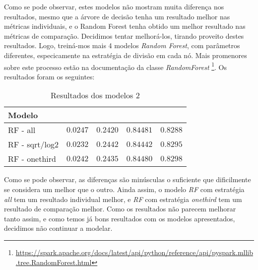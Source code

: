 \documentclass[justified, 11pt]{scrartcl}
\begin{document}
  Como se pode observar, estes modelos não mostram muita diferença nos resultados, mesmo que a árvore de decisão tenha um resultado melhor nas métricas individuais, e o Random Forest tenha obtido um melhor resultado nas métricas de comparação. Decidimos tentar melhorá-los, tirando proveito destes resultados. Logo, treiná-mos mais 4 modelos \textit{Random Forest}, com parâmetros diferentes, especicamente na estratégia de divisão em cada nó. Mais promenores sobre este processo estão na documentação da classe \textit{RandomForest} \footnote{\url{https://spark.apache.org/docs/latest/api/python/reference/api/pyspark.mllib.tree.RandomForest.html}}. Os resultados foram os seguintes:

  \begin{table}[H]
    \centering
    \caption{Resultados dos modelos 2}
    \setlength{\extrarowheight}{0pt}
    \begin{tabulary}{\textwidth}{ L|r r r r }
      Modelo &  &  &  &  \\ \hline
      RF - all & $\boldsymbol{0.0247}$ & $\boldsymbol{0.2420}$ & $\boldsymbol{0.84481}$ & $0.8288$ \\
      RF - sqrt/log2 & $0.0232$ & $0.2442$ & $0.84442$ & $0.8295$ \\
      RF - onethird & $0.0242$ & $0.2435$ & $0.84480$ & $\boldsymbol{0.8298}$ \\
    \end{tabulary}
    \label{tab:results}
  \end{table}

  Como se pode observar, as diferenças são minúsculas o suficiente que dificilmente se considera um melhor que o outro. Ainda assim, o modelo \textit{RF} com estratégia \textit{all} tem um resultado individual melhor, e \textit{RF} com estratégia \textit{onethird} tem um resultado de comparação melhor. Como os resultados não parecem melhorar tanto assim, e como temos já bons resultados com os modelos apresentados, decidimos não continuar a modelar.
\end{document}
